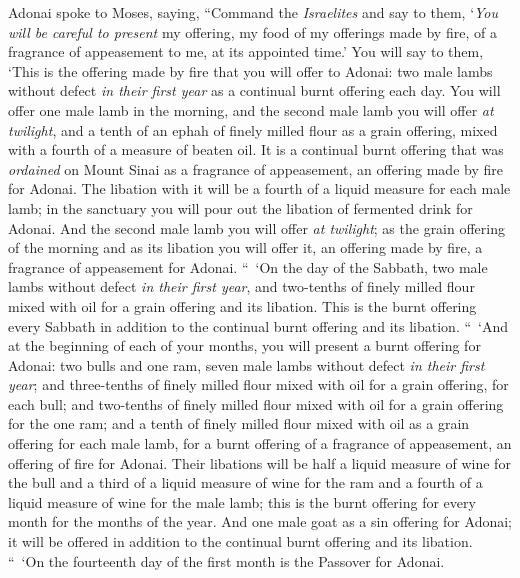 \begin{biblechapter} %
 Adonai spoke to Moses, saying,
\verse “Command the \textit{Israelites} and say to them, ‘\textit{You will be careful to present} my offering, my food of my offerings made by fire, of a fragrance of appeasement to me, at its appointed time.’
\verse You will say to them, ‘This is the offering made by fire that you will offer to Adonai: two male lambs without defect \textit{in their first year} as a continual burnt offering each day.
\verse You will offer one male lamb in the morning, and the second male lamb you will offer \textit{at twilight},
\verse and a tenth of an ephah of finely milled flour as a grain offering, mixed with a fourth of a measure of beaten oil.
\verse It is a continual burnt offering that was \textit{ordained} on Mount Sinai as a fragrance of appeasement, an offering made by fire for Adonai.
\verse The libation with it will be a fourth of a liquid measure for each male lamb; in the sanctuary you will pour out the libation of fermented drink for Adonai.
\verse And the second male lamb you will offer \textit{at twilight}; as the grain offering of the morning and as its libation you will offer it, an offering made by fire, a fragrance of appeasement for Adonai.
\verse “ ‘On the day of the Sabbath, two male lambs without defect \textit{in their first year}, and two-tenths of finely milled flour mixed with oil for a grain offering and its libation.
\verse This is the burnt offering every Sabbath in addition to the continual burnt offering and its libation.
\verse “ ‘And at the beginning of each of your months, you will present a burnt offering for Adonai: two bulls and one ram, seven male lambs without defect \textit{in their first year};
\verse and three-tenths of finely milled flour mixed with oil for a grain offering, for each bull; and two-tenths of finely milled flour mixed with oil for a grain offering for the one ram;
\verse and a tenth of finely milled flour mixed with oil as a grain offering for each male lamb, for a burnt offering of a fragrance of appeasement, an offering of fire for Adonai.
\verse Their libations will be half a liquid measure of wine for the bull and a third of a liquid measure of wine for the ram and a fourth of a liquid measure of wine for the male lamb; this is the burnt offering for every month for the months of the year.
\verse And one male goat as a sin offering for Adonai; it will be offered in addition to the continual burnt offering and its libation.
\verse “ ‘On the fourteenth day of the first month is the Passover for Adonai.

\end{biblechapter}
